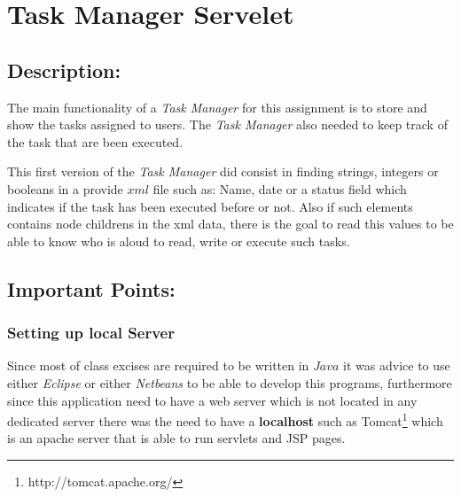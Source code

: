 
\section*{Task Manager Servelet}

\subsection*{Description:}

The main functionality of a \textit{Task Manager} for this assignment is to store and show the tasks assigned to users. The \textit{Task Manager} also needed to keep track of the task that are been executed. 

This first version of the \textit{Task Manager} did consist in finding strings, integers or booleans in a provide $xml$ file such as: Name, date or a status field which indicates if the task has been executed before or not.  Also if such elements contains node childrens in the xml data, there is the goal to read this values to be able to know who is aloud to read, write or execute such tasks. 

\subsection*{Important Points:}

\subsubsection*{Setting up local Server} Since most of class excises are required to be written in $Java$ it was advice to use either \textit{Eclipse} or either \textit{Netbeans} to be able to develop this programs, furthermore since this application need to have a web server which is not located in any dedicated server there was the need to have a \textbf{localhost} such as Tomcat\footnote{http://tomcat.apache.org/} which is an apache server that is able to run servlets and JSP pages.


